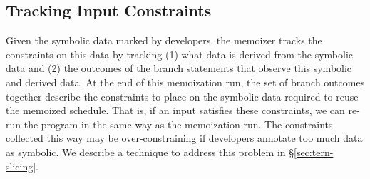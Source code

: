 





   
   
   
   











    



\subsection{Tracking Input Constraints} \label{sec:tern-track-constraints}

Given the symbolic data marked by developers, the memoizer tracks the
constraints on this data by tracking (1) what data is derived from the
symbolic data and (2) the outcomes of the branch statements that observe this
symbolic and derived data.  At the end of this memoization run, the set of
branch outcomes together describe the constraints to place on the symbolic
data required to reuse the memoized schedule.  That is, if an input
satisfies these constraints, we can re-run the program in the same way as
the memoization run.  The constraints collected this way may be
over-constraining if developers annotate too much data as symbolic.  We
describe a technique to address this problem in \S\ref{sec:tern-slicing}.

